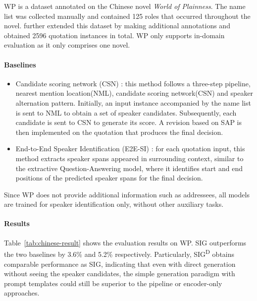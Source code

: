 \documentclass[letterpaper]{article} %
\begin{document}
WP \cite{chen2019chinese} is a dataset annotated on the Chinese novel \textit{World of Plainness}. The name list was collected manually and contained 125 roles that occurred throughout the novel. \citet{chen2021neural} further extended this dataset by making additional annotations and obtained 2596 quotation instances in total. WP only supports in-domain evaluation as it only comprises one novel.

\paragraph{Baselines}
\begin{itemize}
\item Candidate scoring network (CSN) \cite{chen2021neural}: this method follows a three-step pipeline, nearest mention location(NML), candidate scoring network(CSN) and speaker alternation pattern. Initially, an input instance accompanied by the name list is sent to NML to obtain a set of speaker candidates.
Subsequently, each candidate is sent to CSN to generate its score.
A revision based on SAP is then implemented on the quotation that produces the final decision.
\item End-to-End Speaker Identification (E2E-SI) \cite{yu-etal-2022-end}: for each quotation input, this method extracts speaker spans appeared in surrounding context, similar to the extractive Question-Answering model, where it identifies start and end positions of the predicted speaker spans for the final decision.
\end{itemize}

Since WP does not provide additional information such as addressees, all models are trained for speaker identification only, without other auxiliary tasks.

\paragraph{Results}
Table~\ref{tab:chinese-result} shows the evaluation results on WP. SIG outperforms the two baselines by 3.6\% and 5.2\% respectively. Particularly, SIG\textsuperscript{D} obtains comparable performance as SIG, indicating that even with direct generation without seeing the speaker candidates, the simple generation paradigm with prompt templates could still be superior to the pipeline or encoder-only approaches.
\end{document}
